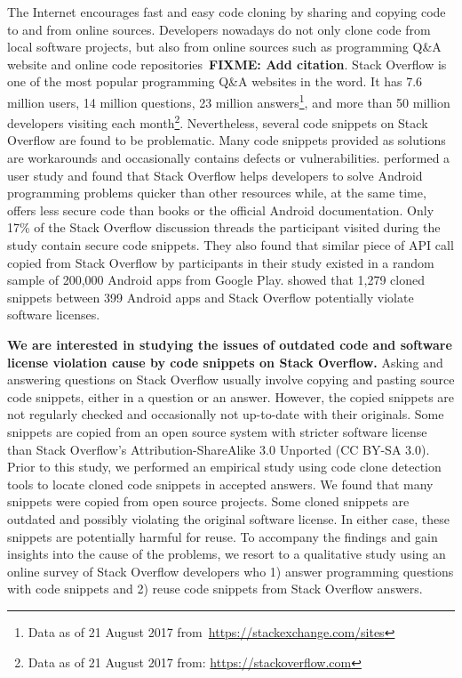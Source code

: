 \documentclass{svjour3}                     %
\newcommand\FIXME[1]{\textbf{FIXME: #1}}
\begin{document}
The Internet encourages fast and easy code cloning by sharing and copying code
to and from online sources. Developers nowadays do not only clone code from local
software projects, but also from online sources such as programming Q\&A website
and online code repositories~\FIXME{Add citation}. Stack Overflow is one of the most popular
programming Q\&A websites in the word. It has 7.6 million users, 14 million
questions, 23 million answers\footnote{Data as of 21 August 2017
	from~\url{https://stackexchange.com/sites}}, and more than 50 million developers
visiting each month\footnote{Data as of 21 August 2017 from:
	\url{https://stackoverflow.com}}. Nevertheless, several code snippets on Stack
Overflow are found to be problematic. Many code snippets provided as solutions
are workarounds and occasionally contains defects or vulnerabilities.
\cite{Acar2016} performed a user study and found that Stack Overflow helps
developers to solve Android programming problems quicker than other resources
while, at the same time, offers less secure code than books or the official
Android documentation. Only 17\% of the Stack Overflow discussion threads the
participant visited during the study contain secure code snippets. They also
found that similar piece of API call copied from Stack Overflow by participants
in their study existed in a random sample of 200,000 Android apps from Google
Play. \cite{An2017} showed that 1,279 cloned snippets between 399 Android apps
and Stack Overflow potentially violate software licenses.

\textbf{We are interested in studying the issues of outdated code and software license
violation cause by code snippets on Stack Overflow.} Asking and answering
questions on Stack Overflow usually involve copying and pasting source code
snippets, either in a question or an answer. However, the copied snippets are
not regularly checked and occasionally not up-to-date with their originals. Some
snippets are copied from an open source system with stricter software license
than Stack Overflow's Attribution-ShareAlike 3.0 Unported (CC BY-SA 3.0). Prior to
this study, we performed an empirical study using code clone detection tools
to locate cloned code snippets in accepted answers. We found that many snippets
were copied from open source projects. Some cloned snippets are outdated and
possibly violating the original software license. In either case, these snippets
are potentially harmful for reuse. To accompany the findings and gain
insights into the cause of the problems, we resort to a qualitative study using
an online survey of Stack Overflow developers who 1) answer programming
questions with code snippets and 2) reuse code snippets from Stack Overflow
answers. 
\end{document}
